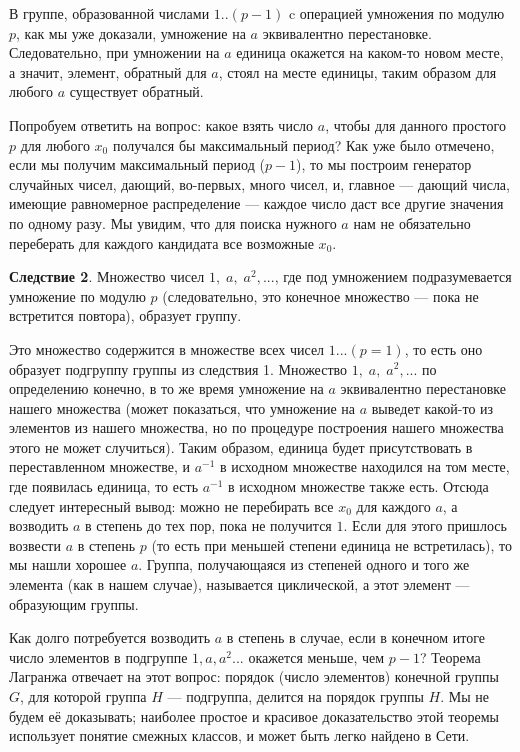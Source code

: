 \documentclass{book}
\begin{document}
В группе, образованной числами $1..(p-1)$ c операцией умножения по модулю $p$, как мы уже доказали,
умножение на $a$ эквивалентно перестановке. Следовательно, при умножении на $a$ единица окажется на
каком-то новом месте, а значит, элемент, обратный для $a$, стоял на месте единицы, таким образом
для любого $a$ существует обратный.

Попробуем ответить на вопрос: какое взять число $a$, чтобы для данного простого $p$ для любого
$x_0$ получался бы максимальный период? Как уже было отмечено, если мы получим максимальный период
($p-1$), то мы построим генератор случайных чисел, дающий, во-первых, много чисел, и, главное ---
дающий числа, имеющие равномерное распределение --- каждое число даст все другие значения по одному
разу. Мы увидим, что для поиска нужного $a$ нам не обязательно переберать для каждого кандидата все
возможные $x_0$.

{\bf Следствие 2}. Множество чисел $1,\; a,\; a^2, ...$, где под умножением подразумевается
умножение по модулю $p$ (следовательно, это конечное множество --- пока не встретится повтора),
образует группу.

Это множество содержится в множестве всех чисел $1...(p=1)$, то есть оно образует
подгруппу группы из следствия 1. Множество $1,\; a,\; a^2, ...$ по определению конечно, в то же время умножение на $a$ эквивалентно
перестановке нашего множества (может показаться, что умножение на $a$ выведет какой-то из элементов
из нашего множества, но по процедуре построения нашего множества этого не может случиться).
Таким образом, единица будет присутствовать в переставленном
множестве, и $a^{-1}$ в исходном множестве находился на том месте, где появилась единица, то есть
$a^{-1}$ в исходном множестве также есть. Отсюда следует интересный вывод: можно не перебирать все $x_0$ для
каждого $a$, а возводить $a$ в степень до тех пор, пока не получится $1$. Если для этого
пришлось возвести $a$ в степень $p$ (то есть при меньшей степени единица не встретилась), то мы
нашли хорошее $a$. Группа, получающаяся из степеней одного и того же элемента (как в нашем случае),
называется циклической, а этот элемент --- образующим группы.

Как долго потребуется возводить $a$ в степень в случае, если в конечном итоге число элементов в
подгруппе $1, a, a^2...$ окажется меньше, чем $p - 1$?  Теорема Лагранжа отвечает на этот вопрос:
порядок (число элементов) конечной группы $G$, для которой группа $H$ --- подгруппа, делится на
порядок группы $H$. Мы не будем её доказывать; наиболее простое и красивое доказательство этой
теоремы использует понятие смежных классов, и может быть легко найдено в Сети.
\end{document}
